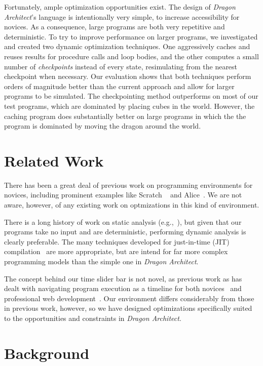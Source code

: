 \documentclass{sig-alternate}
\newcommand{\da}{\emph{Dragon Architect}}
\begin{document}
Fortunately, ample optimization opportunities exist. The design of \da{}'s language is intentionally very simple, to increase accessibility for novices. As a consequence, large programs are both very repetitive and deterministic. To try to improve performance on larger programs, we investigated and created two dynamic optimization techniques. One aggressively caches and reuses results for procedure calls and loop bodies, and the other computes a small number of \emph{checkpoints} instead of every state, resimulating from the nearest checkpoint when necessary. Our evaluation shows that both techniques perform orders of magnitude better than the current approach and allow for larger programs to be simulated. The checkpointing method outperforms on most of our test programs, which are dominated by placing cubes in the world. However, the caching program does substantially better on large programs in which the the program is dominated by moving the dragon around the world.

\section{Related Work}
There has been a great deal of previous work on programming environments for novices, including prominent examples like Scratch ~\cite{resnick2009scratch} and Alice~\cite{cooper2000alice}. We are not aware, however, of any existing work on optmizations in this kind of environment. 

There is a long history of work on static analysis (e.g.,~\cite{cousot1977abstract}), but given that our programs take no input and are deterministic, performing dynamic analysis is clearly preferable. The many techniques developed for just-in-time (JIT) compilation~\cite{aycock2003brief} are more appropriate, but are intend for far more complex programming models than the simple one in \da.

The concept behind our time slider bar is not novel, as previous work as has dealt with navigating program execution as a timeline for both novices~\cite{ko2004designing} and professional web development~\cite{burg2013interactive}. Our environment differs considerably from those in previous work, however, so we have designed optimizations specifically suited to the opportunities and constraints in \da.

\section{Background}
\end{document}
